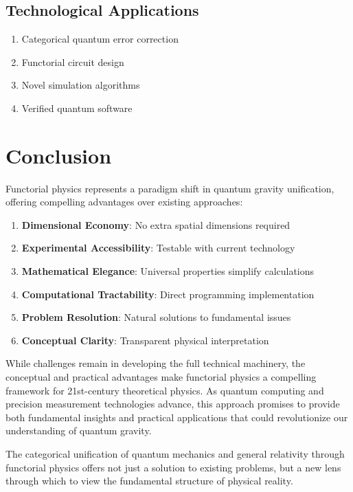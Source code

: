 \documentclass[11pt,a4paper]{article}
\begin{document}
\subsection{Technological Applications}
\begin{enumerate}
    \item Categorical quantum error correction
    \item Functorial circuit design
    \item Novel simulation algorithms
    \item Verified quantum software
\end{enumerate}

\section{Conclusion}

Functorial physics represents a paradigm shift in quantum gravity unification, offering compelling advantages over existing approaches:

\begin{enumerate}
    \item \textbf{Dimensional Economy}: No extra spatial dimensions required
    \item \textbf{Experimental Accessibility}: Testable with current technology
    \item \textbf{Mathematical Elegance}: Universal properties simplify calculations
    \item \textbf{Computational Tractability}: Direct programming implementation
    \item \textbf{Problem Resolution}: Natural solutions to fundamental issues
    \item \textbf{Conceptual Clarity}: Transparent physical interpretation
\end{enumerate}

While challenges remain in developing the full technical machinery, the conceptual and practical advantages make functorial physics a compelling framework for 21st-century theoretical physics. As quantum computing and precision measurement technologies advance, this approach promises to provide both fundamental insights and practical applications that could revolutionize our understanding of quantum gravity.

The categorical unification of quantum mechanics and general relativity through functorial physics offers not just a solution to existing problems, but a new lens through which to view the fundamental structure of physical reality.
\end{document}
